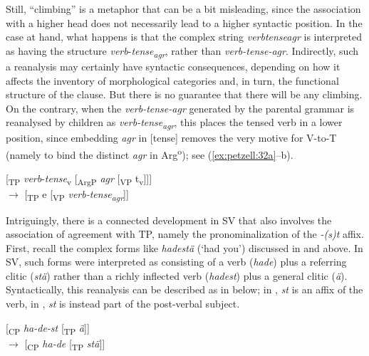 \documentclass[output=paper,colorlinks,citecolor=brown,draft,draftmode]{langscibook}
\begin{document}
Still, “climbing” is a metaphor that can be a bit misleading, since the association with a higher head does not necessarily lead to a higher syntactic position. In the case at hand, what happens is that the complex string \textit{verbtenseagr} is interpreted as having the structure \textit{verb}\nobreakdash-\textit{tense\textsubscript{agr}}, rather than \textit{verb-tense-agr}. Indirectly, such a reanalysis may certainly have syntactic consequences, depending on how it affects the inventory of morphological categories and, in turn, the functional structure of the clause. But there is no guarantee that there will be any climbing. On the contrary, when the \textit{verb-tense-agr} generated by the parental grammar is reanalysed by children as \textit{verb-tense\textsubscript{agr}}, this places the tensed verb in a lower position, since embedding \textit{agr} in [tense] removes the very motive for V-to-T (namely to bind the distinct \textit{agr} in Arg\textsuperscript{o}); see (\ref{ex:petzell:32a}–b).


\ea\label{ex:petzell:32}
\ea\label{ex:petzell:32a}[\textsubscript{TP} \textit{verb}-\textit{tense}\textsubscript{v} [\textsubscript{ArgP} \textit{agr} [\textsubscript{VP} t\textsubscript{v}]]] \\
\ex\label{ex:petzell:32b}  $\to$ [\textsubscript{TP} e [\textsubscript{VP} \textit{verb-tense\textsubscript{agr}}]]
\z
\z


Intriguingly, there is a connected development in SV that also involves the association of agreement with TP, namely the pronominalization of the \textit{-(s)t} affix. First, recall the complex forms like \textit{hadestä} (‘had you’) discussed in  and  above. In SV, such forms were interpreted as consisting of a verb (\textit{hade}) plus a referring clitic (\textit{stä}) rather than a richly inflected verb (\textit{hadest}) plus a general clitic (\textit{ä}). Syntactically, this reanalysis can be described as in  below; in , \textit{st} is an affix of the verb, in , \textit{st} is instead part of the post-verbal subject.


\ea\label{ex:petzell:33}
\ea\label{ex:petzell:33a}  [\textsubscript{CP} \textit{ha-de-st} [\textsubscript{TP} \textit{ä}]]\\
\ex\label{ex:petzell:33b}{}  $\to$ [\textsubscript{CP} \textit{ha-de} [\textsubscript{TP} \textit{stä}]]
\z
\z
\end{document}
